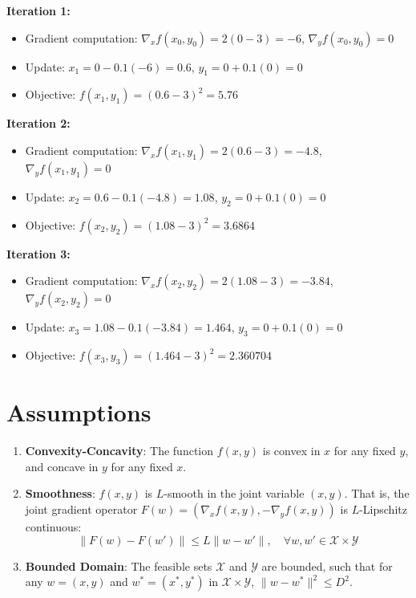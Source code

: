 \documentclass{article}
\begin{document}
\textbf{Iteration 1:}
\begin{itemize}
\item Gradient computation: $\nabla_x f(x_0, y_0) = 2(0-3) = -6$, $\nabla_y f(x_0, y_0) = 0$
\item Update: $x_1 = 0 - 0.1(-6) = 0.6$, $y_1 = 0 + 0.1(0) = 0$
\item Objective: $f(x_1, y_1) = (0.6-3)^2 = 5.76$
\end{itemize}

\textbf{Iteration 2:}
\begin{itemize}
\item Gradient computation: $\nabla_x f(x_1, y_1) = 2(0.6-3) = -4.8$, $\nabla_y f(x_1, y_1) = 0$
\item Update: $x_2 = 0.6 - 0.1(-4.8) = 1.08$, $y_2 = 0 + 0.1(0) = 0$
\item Objective: $f(x_2, y_2) = (1.08-3)^2 = 3.6864$
\end{itemize}

\textbf{Iteration 3:}
\begin{itemize}
\item Gradient computation: $\nabla_x f(x_2, y_2) = 2(1.08-3) = -3.84$, $\nabla_y f(x_2, y_2) = 0$
\item Update: $x_3 = 1.08 - 0.1(-3.84) = 1.464$, $y_3 = 0 + 0.1(0) = 0$
\item Objective: $f(x_3, y_3) = (1.464-3)^2 = 2.360704$
\end{itemize}

\newpage
\section*{Assumptions}
\begin{enumerate}
\item \textbf{Convexity-Concavity}: The function $f(x,y)$ is convex in $x$ for any fixed $y$, and concave in $y$ for any fixed $x$.
\item \textbf{Smoothness}: $f(x,y)$ is $L$-smooth in the joint variable $(x,y)$. That is, the joint gradient operator $F(w) = (\nabla_x f(x,y), -\nabla_y f(x,y))$ is $L$-Lipschitz continuous:
$$ \|F(w) - F(w')\| \leq L \|w - w'\|, \quad \forall w, w' \in \mathcal{X} \times \mathcal{Y} $$
\item \textbf{Bounded Domain}: The feasible sets $\mathcal{X}$ and $\mathcal{Y}$ are bounded, such that for any $w = (x,y)$ and $w^* = (x^*, y^*)$ in $\mathcal{X} \times \mathcal{Y}$, $\|w - w^*\|^2 \leq D^2$.
\end{enumerate}
\end{document}
